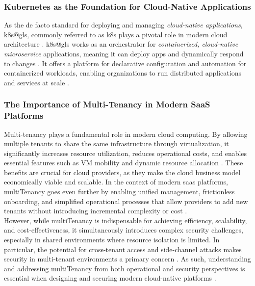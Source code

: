 \documentclass[11pt, a4paper, oneside, listof=totoc]{scrartcl}
\begin{document}
            \subsubsection{Kubernetes as the Foundation for Cloud-Native Applications}\label{subsubsec:foundationK8s}
                As the de facto standard for deploying and managing 
                \textit{cloud-native applications}, \gls{k8s@gls}, commonly referred to as \gls{k8s}
                plays a pivotal role in modern cloud architecture \parencite[p.~7--8]{poulton2021}.
                \gls{k8s@gls} works as an  orchestrator for \textit{containerized,
                cloud-native microservice} applications, meaning it can deploy apps and dynamically
                respond to changes \parencite[p.~3]{poulton2021}.
                It offers a platform for declarative configuration and automation for containerized
                workloads, enabling organizations to run distributed applications and services at
                scale \parencite{kubernetesOverview,redhatWhatIsKubernetes}.

            \subsubsection{The Importance of Multi-Tenancy in Modern SaaS Platforms}\label{subsubsec:mtImportance}
                Multi-tenancy plays a fundamental role in modern cloud computing.
                By allowing multiple tenants to share the same infrastructure through
                virtualization, it significantly increases resource utilization, reduces operational
                costs, and enables essential features such as VM mobility and dynamic resource
                allocation \parencite[pp.~345--346]{aljahdali2014}. 
                These benefits are crucial for cloud providers, as they make the cloud business
                model economically viable and scalable.
                In the context of modern \gls{saas} platforms, \gls{multiTenancy} goes even further
                by enabling unified management, frictionless onboarding, and simplified operational
                processes that allow providers to add new tenants without introducing incremental
                complexity or cost \parencite[pp.~9--11]{awsSaaSArchitectureFundamentals}.
                \\
                However, while \gls{multiTenancy} is indispensable for achieving efficiency,
                scalability, and cost-effectiveness, it simultaneously introduces complex security
                challenges, especially in shared environments where resource isolation is limited. 
                In particular, the potential for cross-tenant access and side-channel attacks makes
                security in multi-tenant environments a primary concern
                \parencite[pp.~345--346]{aljahdali2014}. 
                As such, understanding and addressing \gls{multiTenancy} from both operational and
                security perspectives is essential when designing and securing modern cloud-native
                platforms
                \parencites[pp.~9--11]{awsSaaSArchitectureFundamentals}[p.~4]{isoConcepts}.
\end{document}
